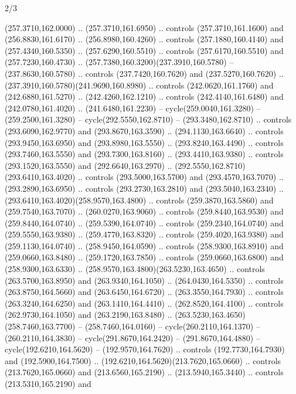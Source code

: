 \begin{flagdescription}{2/3}
\begin{scope}[xshift=0.5\flaglength,yshift=0.5\flagwidth,scale=\flagwidth/259.2]
\begin{scope}[y=0.8pt, x=0.8pt, yscale=-1,shift={(-243,-162)}]
      (257.3710,162.0000) .. (257.3710,161.6950) .. controls (257.3710,161.1600) and
      (256.8830,161.6170) .. (256.8980,160.4260) .. controls (257.1880,160.4140) and
      (257.4340,160.5350) .. (257.6290,160.5510) .. controls (257.6170,160.5510) and
      (257.7230,160.4730) .. (257.7380,160.3200)(237.3910,160.5780) --
      (237.8630,160.5780) .. controls (237.7420,160.7620) and (237.5270,160.7620) ..
      (237.3910,160.5780)(241.9690,160.8980) .. controls (242.0620,161.1760) and
      (242.6880,161.5270) .. (242.4260,162.1210) .. controls (242.4140,161.6480) and
      (242.0780,161.4020) .. (241.6480,161.2230) -- cycle(259.0040,161.3280) --
      (259.2500,161.3280) -- cycle(292.5550,162.8710) -- (293.3480,162.8710) ..
      controls (293.6090,162.9770) and (293.8670,163.3590) .. (294.1130,163.6640) ..
      controls (293.9450,163.6950) and (293.8980,163.5550) .. (293.8240,163.4490) ..
      controls (293.7460,163.5550) and (293.7300,163.8160) .. (293.4410,163.9380) ..
      controls (293.1520,163.5550) and (292.6640,163.2970) ..
      (292.5550,162.8710)(293.6410,163.4020) .. controls (293.5000,163.5700) and
      (293.4570,163.7070) .. (293.2890,163.6950) .. controls (293.2730,163.2810) and
      (293.5040,163.2340) .. (293.6410,163.4020)(258.9570,163.4800) .. controls
      (259.3870,163.5860) and (259.7540,163.7070) .. (260.0270,163.9060) .. controls
      (259.8440,163.9530) and (259.8440,164.0740) .. (259.5390,164.0740) .. controls
      (259.2340,164.0740) and (259.5550,163.9380) .. (259.4770,163.8320) .. controls
      (259.4020,163.9380) and (259.1130,164.0740) .. (258.9450,164.0590) .. controls
      (258.9300,163.8910) and (259.0660,163.8480) .. (259.1720,163.7850) .. controls
      (259.0660,163.6800) and (258.9300,163.6330) ..
      (258.9570,163.4800)(263.5230,163.4650) .. controls (263.5700,163.8950) and
      (263.9340,164.1050) .. (264.0430,164.5350) .. controls (263.8750,164.5660) and
      (263.6450,164.6720) .. (263.3550,164.7930) .. controls (263.3240,164.6250) and
      (263.1410,164.4410) .. (262.8520,164.4100) .. controls (262.9730,164.1050) and
      (263.2190,163.8480) .. (263.5230,163.4650)(258.7460,163.7700) --
      (258.7460,164.0160) -- cycle(260.2110,164.1370) -- (260.2110,164.3830) --
      cycle(291.8670,164.2420) -- (291.8670,164.4880) -- cycle(192.6210,164.5620) --
      (192.9570,164.7620) .. controls (192.7730,164.7930) and (192.5900,164.7500) ..
      (192.6210,164.5620)(213.7620,165.0660) .. controls (213.7620,165.0660) and
      (213.6560,165.2190) .. (213.5940,165.3440) .. controls (213.5310,165.2190) and

\end{scope}
\end{scope}
\end{flagdescription}

